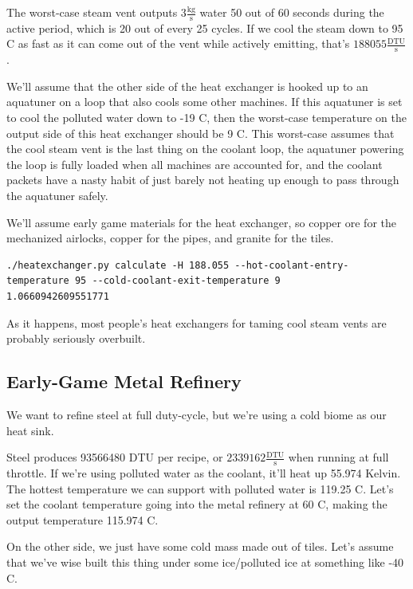\documentclass{article}
\numberwithin{equation}{subsection}
\theoremstyle{remark}
\begin{document}
The worst-case steam vent outputs \(3 \frac{\mathrm{kg}}{\mathrm{s}}\) water 50 out of 60 seconds during the active period, which is 20 out of every 25 cycles.  If we cool the steam down to 95 \degree{}C as fast as it can come out of the vent while actively emitting, that's \(188055 \frac{\mathrm{DTU}}{\mathrm{s}}\).

We'll assume that the other side of the heat exchanger is hooked up to an aquatuner on a loop that also cools some other machines.
If this aquatuner is set to cool the polluted water down to -19 \degree{}C, then the worst-case temperature on the output side of this heat exchanger should be 9 \degree{}C.
This worst-case assumes that the cool steam vent is the last thing on the coolant loop, the aquatuner powering the loop is fully loaded when all machines are accounted for, and the coolant packets have a nasty habit of just barely not heating up enough to pass through the aquatuner safely.

We'll assume early game materials for the heat exchanger, so copper ore for the mechanized airlocks, copper for the pipes, and granite for the tiles.

\begin{verbatim}
./heatexchanger.py calculate -H 188.055 --hot-coolant-entry-temperature 95 --cold-coolant-exit-temperature 9
1.0660942609551771
\end{verbatim}

As it happens, most people's heat exchangers for taming cool steam vents are probably seriously overbuilt.

\subsection{Early-Game Metal Refinery}

We want to refine steel at full duty-cycle, but we're using a cold biome as our heat sink.

Steel produces 93566480 DTU per recipe, or \(2339162 \frac{\mathrm{DTU}}{\mathrm{s}}\) when running at full throttle.
If we're using polluted water as the coolant, it'll heat up 55.974 Kelvin.
The hottest temperature we can support with polluted water is 119.25 \degree{}C.
Let's set the coolant temperature going into the metal refinery at 60 \degree{}C, making the output temperature 115.974 \degree{}C.

On the other side, we just have some cold mass made out of tiles.
Let's assume that we've wise built this thing under some ice/polluted ice at something like -40 \degree{}C.
\end{document}
